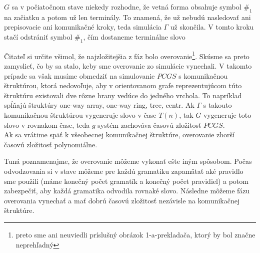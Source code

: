 \begin{dokaz}
\begin{description}
    $G$ sa v počiatočnom stave niekedy rozhodne, že vetná forma
    obsahuje symbol $\#_1$ na začiatku a potom už len terminály. To znamená,
    že už nebudú nasledovať ani prepisovacie ani komunikačné kroky, teda simulácia
    $\Gamma$ už skončila. V tomto kroku stačí odstrániť symbol
    $\#_1$, čím dostaneme terminálne slovo
  \end{description}
  Čitateľ si určite všimol, že najzložitejšia z fáz bolo
  overovanie\footnote{preto sme ani neuviedli príslušný obrázok
  1-a-prekladača, ktorý by bol značne neprehľadný}. Skúsme sa preto
  zamyslieť, čo by sa stalo, keby sme overovanie zo simulácie
  vynechali. V takomto prípade sa však musíme obmedziť na
  simulovanie $PCGS$ s komunikačnou štruktúrou, ktorá nedovoľuje,
  aby v orientovanom grafe reprezentujúcom túto štruktúru existovali
  dve rôzne hrany vedúce do jedného vrchola. To napríklad spĺňajú
  štruktúry one-way array, one-way ring, tree, centr. Ak $\Gamma$ s
  takouto komunikačnou štruktúrou vygeneruje slovo v čase $T(n)$,
  tak $G$ vygeneruje toto slovo v rovnakom čase, teda $g$-systém
  zachováva časovú zložitosť $PCGS$.
  \\ Ak sa vrátime späť k všeobecnej komunikačnej štruktúre,
  overovanie zhorší časovú zložitosť polynomiálne.

  Tuná poznamenajme, že overovanie môžeme vykonať ešte iným spôsobom.
  Počas odvodzovania si v stave môžeme pre každú gramatiku zapamätať aké pravidlo sme použili 
  (máme konečný počet gramatík a konečný počet pravidiel) a potom zabezpečiť, aby každá
  gramatika odvodila rovnaké slovo. Následne môžeme fázu overovania vynechať
  a mať dobrú časovú zložitosť nezávisle na komunikačnej štruktúre.
\end{dokaz}
